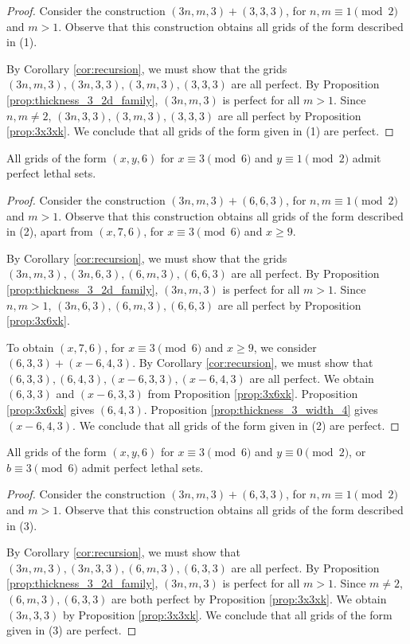 \begin{proof}
Consider the construction $(3n,m,3) + (3,3,3)$, for $n,m \equiv 1 \pmod 2$ and $m > 1$. Observe that this construction obtains all grids of the form described in (1).

By Corollary \ref{cor:recursion}, we must show that the grids $(3n,m,3), (3n,3,3), (3,m,3),(3,3,3)$ are all perfect. By Proposition \ref{prop:thickness_3_2d_family}, $(3n,m,3)$ is perfect for all $m > 1$. Since $n,m \neq 2$, $(3n,3,3), (3,m,3),(3,3,3)$ are all perfect by Proposition \ref{prop:3x3xk}. We conclude that all grids of the form given in (1) are perfect.
\end{proof}

\begin{lem}
\label{lem:thickness_6_case_2}
All grids of the form $(x,y,6)$ for $x \equiv 3 \pmod 6$ and $y \equiv 1 \pmod 2$ admit perfect lethal sets.
\end{lem}

\begin{proof}
Consider the construction $(3n,m,3) + (6,6,3)$, for $n,m \equiv 1 \pmod 2$ and $m > 1$. Observe that this construction obtains all grids of the form described in (2), apart from $(x,7,6)$, for $x \equiv 3 \pmod 6$ and $x \geq 9$. 

By Corollary \ref{cor:recursion}, we must show that the grids $(3n,m,3), (3n,6,3), (6,m,3), (6,6,3)$ are all perfect. By Proposition \ref{prop:thickness_3_2d_family}, $(3n,m,3)$ is perfect for all $m > 1$. Since $n,m > 1$, $(3n,6,3), (6,m,3), (6,6,3)$ are all perfect by Proposition \ref{prop:3x6xk}.

To obtain $(x,7,6)$, for $x \equiv 3 \pmod 6$ and $x \geq 9$, we consider $(6,3,3) + (x-6, 4,3)$. By Corollary \ref{cor:recursion}, we must show that $(6,3,3), (6,4,3), (x-6,3,3), (x-6,4,3)$ are all perfect. We obtain $(6,3,3)$ and $(x-6,3,3)$ from Proposition \ref{prop:3x6xk}. Proposition \ref{prop:3x6xk} gives $(6,4,3)$. Proposition \ref{prop:thickness_3_width_4} gives $(x-6,4,3)$. We conclude that all grids of the form given in (2) are perfect. 
\end{proof}

\begin{lem}
\label{lem:thickness_6_case_3}
All grids of the form $(x,y,6)$ for $x \equiv 3 \pmod 6$ and $y \equiv 0 \pmod 2$, or $b \equiv 3 \pmod 6$ admit perfect lethal sets.
\end{lem}

\begin{proof}
Consider the construction $(3n,m,3) + (6,3,3)$, for $n,m \equiv 1 \pmod 2$ and $m > 1$. Observe that this construction obtains all grids of the form described in (3). 

By Corollary \ref{cor:recursion}, we must show that $(3n,m,3), (3n,3,3), (6,m,3), (6,3,3)$ are all perfect. By Proposition \ref{prop:thickness_3_2d_family}, $(3n,m,3)$ is perfect for all $m > 1$. Since $m \neq 2$, $(6,m,3),(6,3,3)$ are both perfect by Proposition \ref{prop:3x3xk}. We obtain $(3n,3,3)$ by Proposition \ref{prop:3x3xk}. We conclude that all grids of the form given in (3) are perfect.
\end{proof}

